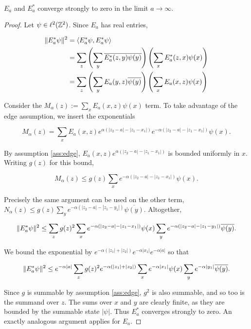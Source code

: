 \documentclass[12pt, letterpaper]{article}
\begin{document}
\begin{lemma}
$E_a$ and $E_a^*$ converge strongly to zero in the limit $a\to\infty$.
\label{lemma:edge}
\end{lemma}
\begin{proof}
Let $\psi \in \ell^2(\mathbb{Z}^2)$. Since $E_a$ has real entries,

\[\begin{aligned}
\lVert E_a^* \psi \rVert^2 &= \langle E_a^*\psi, E_a^* \psi \rangle\\
&=\sum_z \left(\sum_y \overline{E_a^*(z,y)\psi(y)}\right) \left(\sum_x E_a^*(z,x)\psi(x)\right)\\
&=\sum_{z} \left(\sum_y E_a(y,z)\overline{\psi(y)}\right) \left(\sum_x E_a(x,z)\psi(x)\right)\\
\end{aligned}\]

Consider the $M_\alpha(z) := \sum_x E_a(x,z)\psi(x)$ term. To take advantage of the edge assumption, we insert the exponentials

\[M_\alpha(z) = \sum_x E_a(x,z)e^{\alpha (|z_2-a|-|z_1-x_1|)} e^{-\alpha (|z_2-a|-|z_1-x_1|)}\psi(x).\]

By assumption \ref{ass:edge}, $E_a(x,z)e^{\alpha (|z_2-a|-|z_1-x_1|)}$ is bounded uniformly in $x$. Writing $g(z)$ for this bound,

\[M_\alpha(z) \leq g(z) \sum_x e^{-\alpha (|z_2-a|-|z_1-x_1|)}\psi(x).\]

Precisely the same argument can be used on the other term, $N_\alpha(z) \leq g(z) \sum_y e^{-\alpha (|z_2-a|-|z_1-y_1|)}\overline{\psi(y)}$. Altogether,

\[\lVert E_a^* \psi \rVert^2 \leq \sum_z g(z)^2 \sum_x e^{-\alpha (|z_2-a|-|z_1-x_1|)}\psi(x)\sum_y e^{-\alpha (|z_2-a|-|z_1-y_1|)}\overline{\psi(y)}.\]

We bound the exponential by $e^{-\alpha (|z_1|+|z_2|)}e^{-\alpha |x_1|}e^{-\alpha|a|}$ so that

\[\lVert E_a^* \psi \rVert^2 \leq e^{-\alpha|a|}\sum_z g(z)^2 e^{-\alpha (|z_1|+|z_2|)} \sum_x e^{-\alpha |x_1|}\psi(x)\sum_y e^{-\alpha |y_1|}\overline{\psi(y)}.\]

Since $g$ is summable by assumption \ref{ass:edge}, $g^2$ is also summable, and so too is the summand over $z$. The sums over $x$ and $y$ are clearly finite, as they are bounded by the summable state $|\psi|$. Thus $E_a^*$ converges strongly to zero. An exactly analogous argument applies for $E_a$.

\end{proof}
\end{document}
